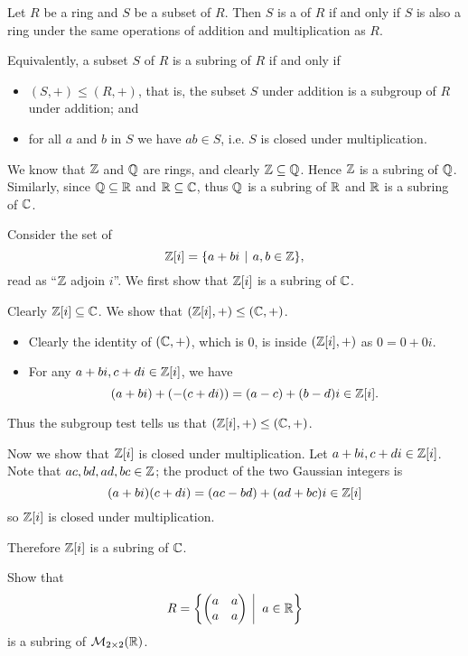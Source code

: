 \begin{definition}
    Let $R$ be a ring and $S$ be a subset of $R$. Then $S$ is a  of $R$ if and only if $S$ is also a ring under the same operations of addition and multiplication as $R$.
\end{definition}
\begin{remark}
    Equivalently, a subset $S$ of $R$ is a subring of $R$ if and only if
    \begin{itemize}
        \item $(S, +) \leq (R, +)$, that is, the subset $S$ under addition is a subgroup of $R$ under addition; and
        \item for all $a$ and $b$ in $S$ we have $ab \in S$, i.e. $S$ is closed under multiplication.
    \end{itemize}
\end{remark}

\begin{example}
    We know that $\mathbb{Z}$ and $\mathbb{Q}$ are rings, and clearly $\mathbb{Z} \subseteq \mathbb{Q}$. Hence $\mathbb{Z}$ is a subring of $\mathbb{Q}$. Similarly, since $\mathbb{Q} \subseteq \mathbb{R}$ and $\mathbb{R} \subseteq \mathbb{C}$, thus $\mathbb{Q}$ is a subring of $\mathbb{R}$ and $\mathbb{R}$ is a subring of $\mathbb{C}$.
\end{example}

\begin{example}
    Consider the set of 
    \[
        \Z[i] = \{a + bi \vert a,b\in\mathbb{Z}\},
    \]
    read as ``$\mathbb{Z}$ adjoin $i$''. We first show that $\mathbb{Z}[i]$ is a subring of $\mathbb{C}$.

    Clearly $\mathbb{Z}[i] \subseteq \mathbb{C}$. We show that $(\mathbb{Z}[i], +) \leq (\mathbb{C}, +)$.
    \begin{itemize}
        \item Clearly the identity of $(\mathbb{C}, +)$, which is 0, is inside $(\mathbb{Z}[i], +)$ as $0 = 0 + 0i$.
        \item For any $a + bi, c+di \in \mathbb{Z}[i]$, we have
        \[
            (a+bi) + (-(c+di)) = (a-c) + (b-d)i \in \mathbb{Z}[i].
        \]
    \end{itemize}
    Thus the subgroup test tells us that $(\mathbb{Z}[i], +) \leq (\mathbb{C}, +)$.

    Now we show that $\mathbb{Z}[i]$ is closed under multiplication. Let $a + bi, c+di \in \mathbb{Z}[i]$. Note that $ac, bd, ad, bc \in \mathbb{Z}$; the product of the two Gaussian integers is
    \[
        (a+bi)(c+di) = (ac-bd) + (ad+bc)i \in \mathbb{Z}[i]
    \]
    so $\mathbb{Z}[i]$ is closed under multiplication.

    Therefore $\mathbb{Z}[i]$ is a subring of $\mathbb{C}$.
\end{example}
\begin{exercise}
    Show that
    \[
        R = \left\{\begin{pmatrix}a&a\\a&a\end{pmatrix} \vert a \in \R\right\}
    \]
    is a subring of $\mathcal{M}_{2\times2}(\mathbb{R})$.
\end{exercise}

